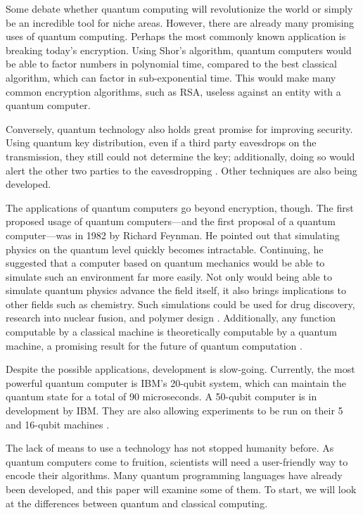 \documentclass[]{article}
\begin{document}
Some debate whether quantum computing will revolutionize the world or simply be an incredible tool for niche areas. However, there are already many promising uses of quantum computing. Perhaps the most commonly known application is breaking today's encryption. Using Shor's algorithm, quantum computers would be able to factor numbers in polynomial time, compared to the best classical algorithm, which can factor in sub-exponential time. This would make many common encryption algorithms, such as RSA, useless against an entity with a quantum computer.

Conversely, quantum technology also holds great promise for improving security. Using quantum key distribution, even if a third party eavesdrops on the transmission, they still could not determine the key; additionally, doing so would alert the other two parties to the eavesdropping \cite{ouellette_2005}. Other techniques are also being developed. 

The applications of quantum computers go beyond encryption, though. The first proposed usage of quantum computers---and the first proposal of a quantum computer---was in 1982 by Richard Feynman. He pointed out that simulating physics on the quantum level quickly becomes intractable. Continuing, he suggested that a computer based on quantum mechanics would be able to simulate such an environment far more easily. Not only would being able to simulate quantum physics advance the field itself, it also brings implications to other fields such as chemistry. Such simulations could be used for drug discovery, research into nuclear fusion, and polymer design \cite{kim_2017}. Additionally, any function computable by a classical machine is theoretically computable by a quantum machine, a promising result for the future of quantum computation \cite{deutsch1985}.

Despite the possible applications, development is slow-going. Currently, the most powerful quantum computer is IBM's 20-qubit system, which can maintain the quantum state for a total of 90 microseconds. A 50-qubit computer is in development by IBM. They are also allowing experiments to be run on their 5 and 16-qubit machines \cite{ibm_q}.

The lack of means to use a technology has not stopped humanity before. As quantum computers come to fruition, scientists will need a user-friendly way to encode their algorithms. Many quantum programming languages have already been developed, and this paper will examine some of them. To start, we will look at the differences between quantum and classical computing.
\end{document}
